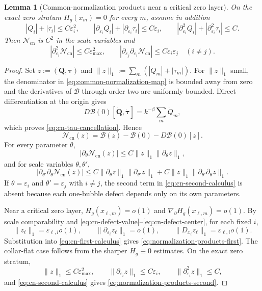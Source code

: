 \documentclass[11pt,reqno,a4paper]{amsart}
\numberwithin{equation}{section}
\theoremstyle{plain}
\newtheorem{lemma}[theorem]{Lemma}
\theoremstyle{remark}
\theoremstyle{plain}
\begin{document}
\begin{lemma}[Common-normalization products near a critical zero layer]
On the exact zero stratum $H_g(x_m)=0$ for every $m$, assume in addition
\[
|Q_i|+|\tau_i|\le C\varepsilon_i^2,
\qquad
|\partial_{\varepsilon_i}Q_i|+|\partial_{\varepsilon_i}\tau_i|\le C\varepsilon_i,
\qquad
|\partial_{\varepsilon_i}^2Q_i|+|\partial_{\varepsilon_i}^2\tau_i|\le C.
\]
Then $\mathcal N_{\mathrm{cn}}$ is $C^2$ in the scale variables and
\begin{equation}\label{eq:normalization-products-second}
|\partial_{\varepsilon_i}^2\mathcal N_{\mathrm{cn}}|
\le C\varepsilon_{\max}^2,
\qquad
|\partial_{\varepsilon_j}\partial_{\varepsilon_i}\mathcal N_{\mathrm{cn}}|
\le C\varepsilon_i\varepsilon_j
\quad(i\ne j).
\end{equation}
\end{lemma}

\begin{proof}
Set $z:=(\mathbf Q,\boldsymbol\tau)$ and
$\|z\|_1:=\sum_m(|Q_m|+|\tau_m|)$.  For $\|z\|_1$ small, the denominator in
\eqref{eq:common-normalization-map} is bounded away from zero and the derivatives of $\mathscr B$ through
order two are uniformly bounded.  Direct differentiation at the origin gives
\[
D\mathscr B(0)[\dot{\mathbf Q},\dot{\boldsymbol\tau}]
=k^{-\beta}\sum_m\dot Q_m,
\]
which proves \eqref{eq:cn-tau-cancellation}.  Hence
\[
\mathcal N_{\mathrm{cn}}(z)=\mathscr B(z)-\mathscr B(0)-D\mathscr B(0)[z].
\]
For every parameter $\theta$,
\begin{equation}\label{eq:cn-first-calculus}
|\partial_\theta\mathcal N_{\mathrm{cn}}(z)|
\le C\|z\|_1\|\partial_\theta z\|_1,
\end{equation}
and for scale variables $\theta,\theta'$,
\begin{equation}\label{eq:cn-second-calculus}
|\partial_{\theta'}\partial_\theta\mathcal N_{\mathrm{cn}}(z)|
\le C\|\partial_\theta z\|_1\|\partial_{\theta'}z\|_1
+C\|z\|_1\|\partial_{\theta'}\partial_\theta z\|_1.
\end{equation}
If $\theta=\varepsilon_i$ and $\theta'=\varepsilon_j$ with $i\ne j$, the second term in
\eqref{eq:cn-second-calculus} is absent because each one-bubble defect depends only on its own parameters.

Near a critical zero layer, $H_g(x_{\ell,m})=o(1)$ and
$\nabla_\partial H_g(x_{\ell,m})=o(1)$.  By scale comparability and
\eqref{eq:cn-defect-value}--\eqref{eq:cn-defect-center}, for each fixed $i$,
\[
\|z_\ell\|_1=\varepsilon_{\ell,i}o(1),
\qquad
\|\partial_{\varepsilon_i}z_\ell\|_1=o(1),
\qquad
\|D_{x_i}z_\ell\|_1=\varepsilon_{\ell,i}o(1).
\]
Substitution into \eqref{eq:cn-first-calculus} gives \eqref{eq:normalization-products-first}.  The collar-flat
case follows from the sharper $H_g\equiv0$ estimates.  On the exact zero stratum,
\[
\|z\|_1\le C\varepsilon_{\max}^2,
\qquad
\|\partial_{\varepsilon_i}z\|_1\le C\varepsilon_i,
\qquad
\|\partial_{\varepsilon_i}^2z\|_1\le C,
\]
and \eqref{eq:cn-second-calculus} gives \eqref{eq:normalization-products-second}.
\end{proof}
\end{document}
